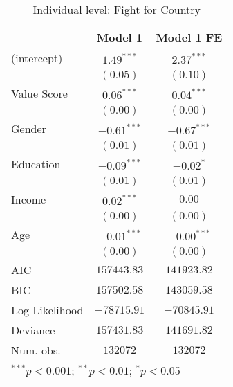 
\begin{table}
\begin{center}
\begin{tabular}{l c c}
\toprule
 & Model 1 & Model 1 FE \\
\midrule
(intercept)    & $1.49^{***}$  & $2.37^{***}$  \\
               & $(0.05)$      & $(0.10)$      \\
Value Score    & $0.06^{***}$  & $0.04^{***}$  \\
               & $(0.00)$      & $(0.00)$      \\
Gender         & $-0.61^{***}$ & $-0.67^{***}$ \\
               & $(0.01)$      & $(0.01)$      \\
Education      & $-0.09^{***}$ & $-0.02^{*}$   \\
               & $(0.01)$      & $(0.01)$      \\
Income         & $0.02^{***}$  & $0.00$        \\
               & $(0.00)$      & $(0.00)$      \\
Age            & $-0.01^{***}$ & $-0.00^{***}$ \\
               & $(0.00)$      & $(0.00)$      \\
\midrule
AIC            & $157443.83$   & $141923.82$   \\
BIC            & $157502.58$   & $143059.58$   \\
Log Likelihood & $-78715.91$   & $-70845.91$   \\
Deviance       & $157431.83$   & $141691.82$   \\
Num. obs.      & $132072$      & $132072$      \\
\bottomrule
\multicolumn{3}{l}{\scriptsize{$^{***}p<0.001$; $^{**}p<0.01$; $^{*}p<0.05$}}
\end{tabular}
\caption{Individual level: Fight for Country}
\label{FCREG}
\end{center}
\end{table}
